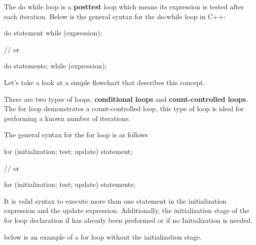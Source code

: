 \documentclass{report}
\begin{document}
    \pagebreak
    \bigbreak \noindent 
    \begin{concept}
 The do while loop is a \textbf{posttest} loop which means its expression is tested after each iteration. Below is the general syntax for the do-while loop in C++:
	\end{concept}
    \bigbreak \noindent 
    
    \begin{cppcode}
do 
    statement
while (expression);

// or 

do {
    statements;
} while (expression);
    \end{cppcode}
    
    \bigbreak \noindent 
    \begin{minipage}[]{0.47\textwidth}
        Let's take a look at a simple flowchart that describes this concept.
    
    \end{minipage}
    \begin{minipage}[]{0.47\textwidth}
    \end{minipage}

    \pagebreak
    \bigbreak \noindent 
    \begin{concept}
 There are two types of loops, \textbf{conditional loops} and \textbf{count-controlled loops}. The for loop demonstrates a count-controlled loop, this type of loop is ideal for performing a known number of iterations.
	\end{concept}
    \bigbreak \noindent 
    The general syntax for the for loop is as follows
    \bigbreak \noindent 
    
    \begin{cppcode}
for (initialization; test; update)  
    statement;

// or

for (initialization; test; update) { 
    statements;
}
    \end{cppcode}
    

    \bigbreak \noindent 
    \begin{notebox}
			It is valid syntax to execute more than one statement in the initialization expression and the update expression. Additionally, the initialization stage of the for loop declaration if has already been preformed or if no Initialization is needed.
		\end{notebox}
    \bigbreak \noindent 
    below is an example of a for loop without the initialization stage.
    \bigbreak \noindent 
    
\end{document}
